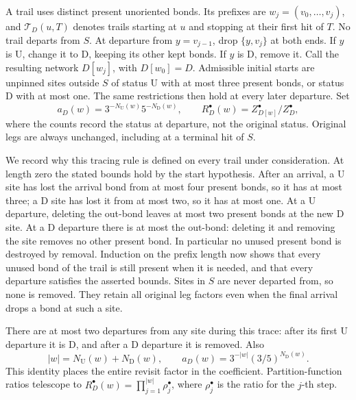 \begin{definition}\label{d:trace}
A trail uses distinct present unoriented bonds. Its prefixes are
\(w_j=(v_0,\ldots,v_j)\), and \(\mathcal T_D(u,T)\) denotes trails
starting at \(u\) and stopping at their first hit of \(T\).
No trail departs from \(S\).
At departure from \(y=v_{j-1}\), drop \(\{y,v_j\}\) at both ends.
If \(y\) is \(\mathrm U\), change it to \(\mathrm D\), keeping its
other kept bonds. If \(y\) is \(\mathrm D\), remove it.
Call the resulting network \(D[w_j]\), with \(D[w_0]=D\).
Admissible initial starts are unpinned sites outside \(S\) of status
\(\mathrm U\) with at most three present bonds, or status \(\mathrm D\)
with at most one. The same restrictions then hold at every later
departure. Set
\[
 a_D(w)=3^{-N_{\mathrm U}(w)}5^{-N_{\mathrm D}(w)},\qquad
 R_D^\bullet(w)=Z^\bullet_{D[w]}/Z^\bullet_D,
\]
where the counts record the status at departure, not the original status.
Original legs are always unchanged, including at a terminal hit of \(S\).
\end{definition}

We record why this tracing rule is defined on every trail under
consideration. At length zero the stated bounds hold by the start
hypothesis. After an arrival, a \(\mathrm U\) site has lost the
arrival bond from at most four present bonds, so it has at most three;
a \(\mathrm D\) site has lost it from at most two, so it has at
most one. At a \(\mathrm U\) departure, deleting the out-bond
leaves at most two present bonds at the new \(\mathrm D\) site.
At a \(\mathrm D\) departure there is at most the out-bond:
deleting it and removing the site removes no other present bond.
In particular no unused present bond is destroyed by removal.
Induction on the prefix length now shows that every unused bond
of the trail is still present when it is needed, and that every
departure satisfies the asserted bounds.
Sites in \(S\) are never departed from, so none is removed.
They retain all original leg factors even when the final arrival
drops a bond at such a site.

There are at most two departures from any site during this trace:
after its first \(\mathrm U\) departure it is \(\mathrm D\), and
after a \(\mathrm D\) departure it is removed. Also
\[
 |w|=N_{\mathrm U}(w)+N_{\mathrm D}(w),\qquad
 a_D(w)=3^{-|w|}(3/5)^{N_{\mathrm D}(w)}.
\]
This identity places the entire revisit factor in the coefficient.
Partition-function ratios telescope to
\(R_D^\bullet(w)=\prod_{j=1}^{|w|}\rho_j^\bullet\), where
\(\rho_j^\bullet\) is the ratio for the \(j\)-th step.


